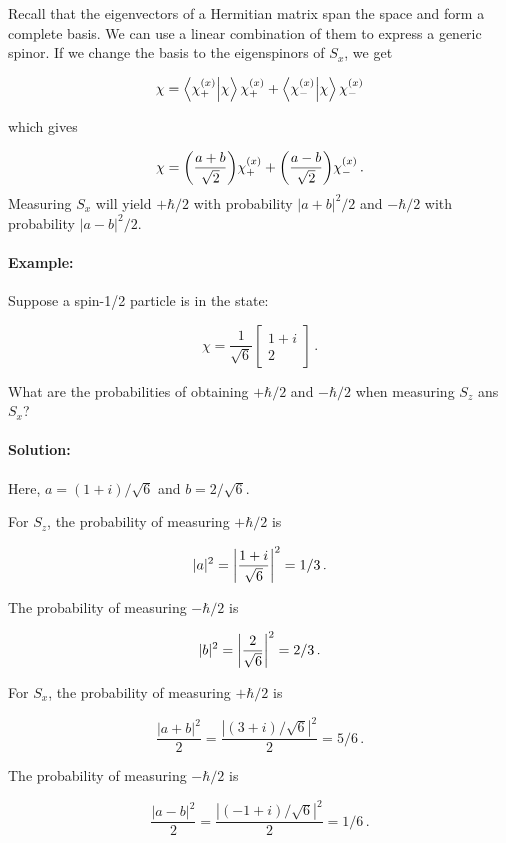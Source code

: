 \documentclass[12pt, titlepage]{article}
\begin{document}
Recall that the eigenvectors of a Hermitian matrix span the space and form a complete basis. We can use a linear combination of them to express a generic spinor. If we change the basis to the eigenspinors of $S_x$, we get

\begin{equation}
	\chi = \bra{\chi_+^{(x)}}\ket{\chi}\chi_+^{(x)} + \bra{\chi_-^{(x)}}\ket{\chi}\chi_-^{(x)}
\end{equation}

which gives

\begin{equation}
	\chi = \qty(\frac{a+b}{\sqrt{2}})\chi_+^{(x)} + \qty(\frac{a-b}{\sqrt{2}})\chi_-^{(x)} \,.
\end{equation}
Measuring $S_x$ will yield $+\hbar/2$ with probability $|a+b|^2/2$ and $-\hbar/2$ with probability $|a-b|^2/2$.
\clearpage

\begin{mdframed}[backgroundcolor=gray!20]
\paragraph*{Example:}
Suppose a spin-1/2 particle is in the state:

\begin{equation*}
	\chi = \frac{1}{\sqrt{6}} \begin{bmatrix} 1+i \\ 2 \end{bmatrix} \,.
\end{equation*}

What are the probabilities of obtaining $+\hbar/2$ and $-\hbar/2$ when measuring $S_z$ ans $S_x$?

\paragraph*{Solution:}
Here, $a = (1+i)/\sqrt{6}$ and $b = 2/\sqrt{6}$. 

For $S_z$, the probability of measuring $+\hbar/2$ is 

\begin{equation*}
	|a|^2 = \qty|\frac{1+i}{\sqrt{6}}|^2 = 1/3 \,.
\end{equation*}

The probability of measuring $-\hbar/2$ is

\begin{equation*}
	|b|^2 = \qty|\frac{2}{\sqrt{6}}|^2 = 2/3 \,.
\end{equation*}

For $S_x$, the probability of measuring $+\hbar/2$ is 

\begin{equation*}
	\frac{|a+b|^2}{2} = \frac{|(3+i)/\sqrt{6}|^2}{2} = 5/6 \,.
\end{equation*}

The probability of measuring $-\hbar/2$ is

\begin{equation*}
	\frac{|a-b|^2}{2} = \frac{|(-1+i)/\sqrt{6}|^2}{2} = 1/6 \,.
\end{equation*}
\end{mdframed}
\end{document}

